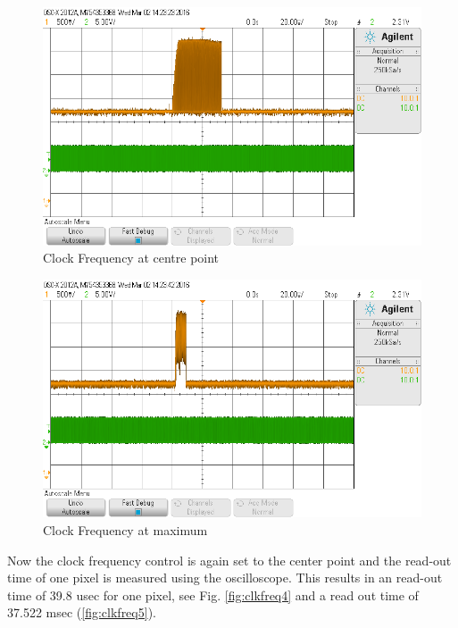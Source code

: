 \begin{figure}[H]
\begin{center}
\includegraphics[scale=0.4]{LabFour/scope_54}
\end{center}
\caption{Clock Frequency at centre point}
\label{fig:clkfreq2}
\end{figure}


\begin{figure}[H]
\begin{center}
\includegraphics[scale=0.4]{LabFour/scope_55}
\end{center}
\caption{Clock Frequency at maximum}
\label{fig:clkfreq3}
\end{figure}

Now the clock frequency control is again set to the center point and the read-out time of one pixel is measured using the oscilloscope. This results in an read-out time of 39.8 usec for one pixel, see Fig. \ref{fig:clkfreq4} and a read out time of 37.522 msec (\ref{fig:clkfreq5}).


